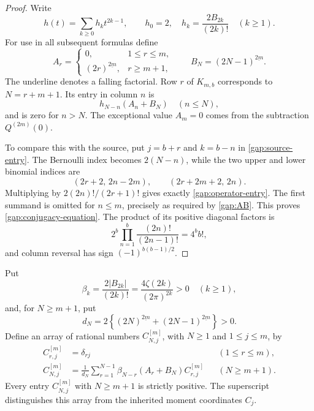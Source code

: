 \begin{proof}
Write
\[
 h(t)=\sum_{k\ge0}h_kt^{2k-1},\qquad
 h_0=2,\quad h_k=\frac{2B_{2k}}{(2k)!}\quad(k\ge1).
\]
For use in all subsequent formulas define
\begin{equation}\label{gap:AB}
 A_r=\begin{cases}0,&1\le r\le m,\\
 (2r)^{\underline{2m}},&r\ge m+1,
 \end{cases}
 \qquad B_N=(2N-1)^{\underline{2m}}.
\end{equation}
The underline denotes a falling factorial. Row $r$ of $K_{m,b}$
corresponds to $N=r+m+1$. Its entry in column $n$ is
\begin{equation}\label{gap:operator-entry}
 h_{N-n}(A_n+B_N)\quad(n\le N),
\end{equation}
and is zero for $n>N$. The exceptional value $A_m=0$ comes from
the subtraction $Q^{(2m)}(0)$.

To compare this with the source, put $j=b+r$ and $k=b-n$ in
\eqref{gap:source-entry}. The Bernoulli index becomes $2(N-n)$,
while the two upper and lower binomial indices are
\[
 (2r+2,\,2n-2m),\qquad(2r+2m+2,\,2n).
\]
Multiplying by $2(2n)!/(2r+1)!$ gives exactly
\eqref{gap:operator-entry}. The first summand is omitted for
$n\le m$, precisely as required by \eqref{gap:AB}. This proves
\eqref{gap:conjugacy-equation}. The product of its positive diagonal
factors is
\[
 2^b\prod_{n=1}^b\frac{(2n)!}{(2n-1)!}=4^bb!,
\]
and column reversal has sign $(-1)^{b(b-1)/2}$.
\end{proof}

Put
\begin{equation}\label{gap:beta}
 \beta_k=\frac{2|B_{2k}|}{(2k)!}
        =\frac{4\zeta(2k)}{(2\pi)^{2k}}>0\quad(k\ge1),
\end{equation}
and, for $N\ge m+1$, put
\begin{equation}\label{gap:d}
 d_N=2\left\{(2N)^{\underline{2m}}+
                    (2N-1)^{\underline{2m}}\right\}>0.
\end{equation}
Define an array of rational numbers $C_{N,j}^{[m]}$, with
$N\ge1$ and $1\le j\le m$, by
\begin{align}
 C_{r,j}^{[m]}&=\delta_{rj}&& (1\le r\le m),
 \label{gap:initial}\\
 C_{N,j}^{[m]}&=\frac1{d_N}\sum_{r=1}^{N-1}
 \beta_{N-r}(A_r+B_N)C_{r,j}^{[m]}
 &&(N\ge m+1).
 \label{gap:recurrence}
\end{align}
Every entry $C_{N,j}^{[m]}$ with $N\ge m+1$ is strictly positive.
The superscript distinguishes this array from the inherited moment
coordinates $C_j$.

